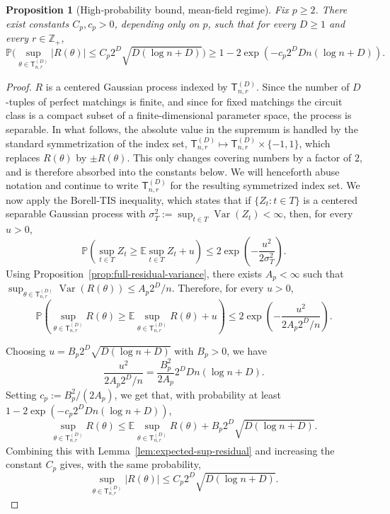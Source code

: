 \documentclass[12pt]{article}
\newtheorem{proposition}[theorem]{Proposition}
\newcommand{\E}{\mathbb{E}}
\renewcommand{\P}{\mathbb{P}}
\newcommand{\tvar}{\operatorname{Var}}
\begin{document}
\begin{proposition}[High-probability bound, mean-field regime]
\label{prop:circuit-residual-high-prob}
Fix \(p\ge 2\). There exist constants \(C_p,c_p>0\), depending only on
\(p\), such that for every \(D\ge1\) and every \(r\in\mathbb Z_+\),
\[
\P\bigg(
\sup_{\theta \in \mathsf{T}_{n,r}^{(D)}}
|R(\theta)|
\le
C_p 2^{D}\sqrt{D(\log n+D)}
\bigg)
\ge
1-2\exp\left(-c_p 2^D Dn(\log n+D)\right).
\]
\end{proposition}



\begin{proof}
 $R$ is a centered Gaussian process indexed by $\mathsf{T}_{n,r}^{(D)}$. Since the number of \(D\)-tuples of perfect matchings is finite, and since for
fixed matchings the circuit class is a compact subset of a finite-dimensional
parameter space, the process is separable. In what follows, the absolute value
in the supremum is handled by the standard symmetrization of the index set,
\(\mathsf{T}_{n,r}^{(D)}\mapsto \mathsf{T}_{n,r}^{(D)}\times\{-1,1\}\), which replaces
\(R(\theta)\) by \(\pm R(\theta)\). This only changes covering
numbers by a factor of \(2\), and is therefore absorbed into the constants
below. We will henceforth abuse notation and continue to write \(\mathsf{T}_{n,r}^{(D)}\)
for the resulting symmetrized index set. We now apply the Borell-TIS inequality, which states that if
\(\{Z_t:t\in T\}\) is a centered separable Gaussian process with
\(\sigma^2_T:=\sup_{t\in T}\tvar(Z_t)<\infty\), then, for every \(u>0\),
\[
\P(
\sup_{t\in T} Z_t
\ge
\E\sup_{t\in T}Z_t+u
)
\le
2\exp\left(
-\frac{u^2}{2\sigma_T^2}
\right).
\]
Using Proposition~\ref{prop:full-residual-variance}, there exists $A_p < \infty$ such that $\sup_{\theta\in\mathsf{T}_{n,r}^{(D)}}\tvar(R(\theta)) \le A_p2^D/n$. Therefore, for every \(u>0\),
\[
\P(
\sup_{\theta\in\mathsf{T}_{n,r}^{(D)}}
R(\theta)
\ge
\E
\sup_{\theta\in\mathsf{T}_{n,r}^{(D)}}
R(\theta)
+u
)
\le
2\exp\left(
-\frac{u^2}{
2A_p2^D/n
}
\right).
\]

Choosing $u
=
B_p
2^{D}
\sqrt{D(\log n+D)}$ with $B_p > 0$, we have
\[
\frac{u^2}{2A_p2^D/n}
=
\frac{B_p^2}{2A_p}
2^D Dn(\log n+D).
\]
Setting \(c_p := B_p^2/(2A_p)\), we get that, with probability at least $1-2\exp(-c_p 2^D Dn(\log n+D))$,
\[
\sup_{\theta\in\mathsf{T}_{n,r}^{(D)}}
R(\theta)
\le
\E
\sup_{\theta\in\mathsf{T}_{n,r}^{(D)}}
R(\theta)
+
B_p
2^{D}
\sqrt{D(\log n+D)}.
\]
Combining this with Lemma~\ref{lem:expected-sup-residual} and increasing the constant \(C_p\)  gives, with the same probability,
\[
\sup_{\theta\in\mathsf{T}_{n,r}^{(D)}}
|R(\theta)|
\le
C_p
2^{D}
\sqrt{D(\log n+D)}.
\]
\end{proof}
\end{document}
